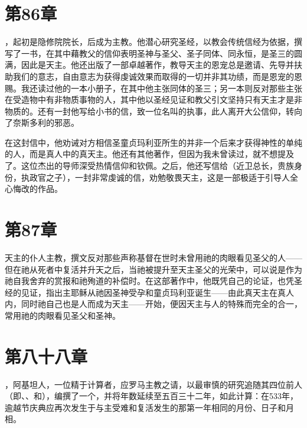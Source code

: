 \section{第86章}

，起初是隐修院院长，后成为主教。他潜心研究圣经，以教会传统信经为依据，撰写了一书，在其中藉教父的信仰表明圣神与圣父、圣子同体、同永恒，是圣三的圆满，因此是天主。他还出版了一部卓越著作，教导天主的恩宠总是邀请、先导并扶助我们的意志，自由意志为获得虔诚效果而取得的一切并非其功绩，而是恩宠的恩赐。我还读过他的一本小册子，在其中他主张同体的圣三；另一本则反对那些主张在受造物中有非物质事物的人，其中他以圣经见证和教父引文坚持只有天主才是非物质的。还有一封他写给小书的信，致一位名叫的执事，此人离开大公信仰，转向了奈斯多利的邪恶。\par

在这封信中，他劝诫对方相信圣童贞玛利亚所生的并非一个后来才获得神性的单纯的人，而是真人中的真天主。他还有其他著作，但因为我未曾读过，就不想提及了。这位杰出的导师深受热情信仰和钦佩。之后，他还写信给（近卫总长，贵族身份，执政官之子），一封非常虔诚的信，劝勉敬畏天主，这是一部极适于引导人全心悔改的作品。\par


\section{第87章}

天主的仆人主教，撰文反对那些声称基督在世时未曾用祂的肉眼看见圣父的人——但在祂从死者中复活并升天之后，当祂被提升至天主圣父的光荣中，可以说是作为祂自我舍弃的赏报和祂殉道的补偿时。在这部著作中，他既凭自己的论证，也凭圣经的见证，指出主耶稣从祂因圣神受孕和童贞玛利亚诞生——由此真天主在真人内，同时祂自己也是人而成为天主——开始，便因天主与人的特殊而完全的合一，常用祂的肉眼看见圣父和圣神。\par


\section{第八十八章}

，阿基坦人，一位精于计算者，应罗马主教之请，以最审慎的研究追随其四位前人（即、、和），编撰了一个，并将年数延续至五百三十二年，如此计算：在533年，逾越节庆典应再次发生于与主受难和复活发生的那第一年相同的月份、日子和月相。\par

